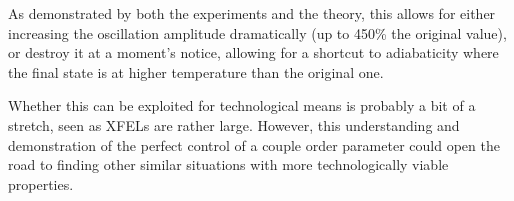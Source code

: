As demonstrated by both the experiments and the theory, this allows for either increasing the oscillation amplitude dramatically (up to 450\% the original value), or destroy it at a moment's notice, allowing for a shortcut to adiabaticity where the final state is at higher temperature than the original one.

Whether this can be exploited for technological means is probably a bit of a stretch, seen as XFELs are rather large. However, this understanding and demonstration of the perfect control of a couple order parameter could open the road to finding other similar situations with more technologically viable properties.   


\printbibliography

